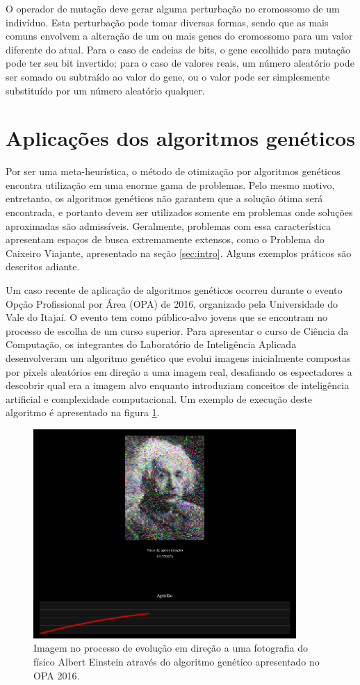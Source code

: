 \documentclass[12pt]{article}
\begin{document}
O operador de mutação deve gerar alguma perturbação no cromossomo de um indivíduo. Esta perturbação pode tomar diversas formas, sendo que as mais comuns envolvem a alteração de um ou mais genes do cromossomo para um valor diferente do atual. Para o caso de cadeias de bits, o gene escolhido para mutação pode ter seu bit invertido; para o caso de valores reais, um número aleatório pode ser somado ou subtraído ao valor do gene, ou o valor pode ser simplesmente substituído por um número aleatório qualquer.

\section{Aplicações dos algoritmos genéticos} \label{sec:applications}

Por ser uma meta-heurística, o método de otimização por algoritmos genéticos encontra utilização em uma enorme gama de problemas. Pelo mesmo motivo, entretanto, os algoritmos genéticos não garantem que a solução ótima será encontrada, e portanto devem ser utilizados somente em problemas onde soluções aproximadas são admissíveis. Geralmente, problemas com essa característica apresentam espaços de busca extremamente extensos, como o Problema do Caixeiro Viajante, apresentado na seção \ref{sec:intro}. Alguns exemplos práticos são descritos adiante.

Um caso recente de aplicação de algoritmos genéticos ocorreu durante o evento Opção Profissional por Área (OPA) de 2016, organizado pela Universidade do Vale do Itajaí. O evento tem como público-alvo jovens que se encontram no processo de escolha de um curso superior. Para apresentar o curso de Ciência da Computação, os integrantes do Laboratório de Inteligência Aplicada desenvolveram um algoritmo genético que evolui imagens inicialmente compostas por pixels aleatórios em direção a uma imagem real, desafiando os espectadores a descobrir qual era a imagem alvo enquanto introduziam conceitos de inteligência artificial e complexidade computacional. Um exemplo de execução deste algoritmo é apresentado na figura \ref{fig:imageevolution}.

\begin{figure}[ht]
    \centering
    \includegraphics[width=10cm]{einstein.png}
    \caption{Imagem no processo de evolução em direção a uma fotografia do físico Albert Einstein através do algoritmo genético apresentado no OPA 2016.}
    \label{fig:imageevolution}
\end{figure}
\end{document}
